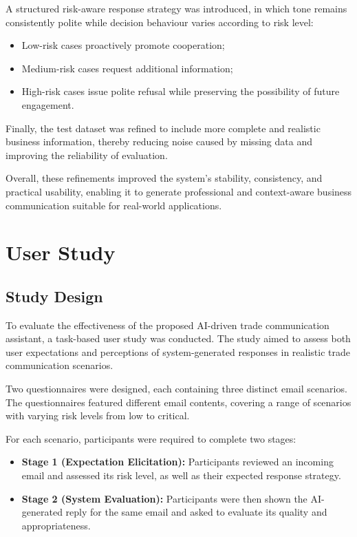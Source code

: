 \documentclass[12pt,a4paper]{report}
\begin{document}
A structured risk-aware response strategy was introduced, in which tone remains consistently polite while decision behaviour varies according to risk level:
\begin{itemize}
    \item Low-risk cases proactively promote cooperation;
    \item Medium-risk cases request additional information;
    \item High-risk cases issue polite refusal while preserving the possibility of future engagement.
\end{itemize}

Finally, the test dataset was refined to include more complete and realistic business information, thereby reducing noise caused by missing data and improving the reliability of evaluation.

Overall, these refinements improved the system’s stability, consistency, and practical usability, enabling it to generate professional and context-aware business communication suitable for real-world applications.

\chapter{User Study}

\section{Study Design}

To evaluate the effectiveness of the proposed AI-driven trade communication assistant, a task-based user study was conducted. The study aimed to assess both user expectations and perceptions of system-generated responses in realistic trade communication scenarios.

Two questionnaires were designed, each containing three distinct email scenarios. The questionnaires featured different email contents, covering a range of scenarios with varying risk levels from low to critical.

For each scenario, participants were required to complete two stages:

\begin{itemize}
    \item \textbf{Stage 1 (Expectation Elicitation):} Participants reviewed an incoming email and assessed its risk level, as well as their expected response strategy.
    
    \item \textbf{Stage 2 (System Evaluation):} Participants were then shown the AI-generated reply for the same email and asked to evaluate its quality and appropriateness.
\end{itemize}
\end{document}
